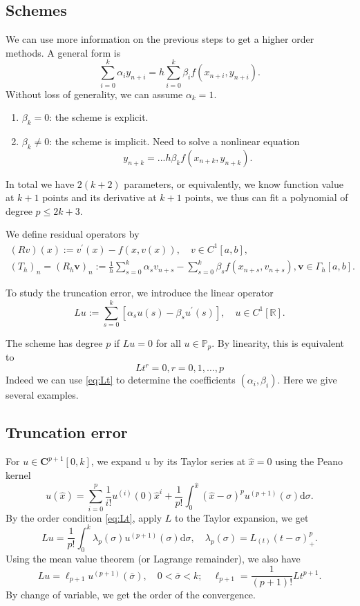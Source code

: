 \documentclass[10pt]{amsart}
\begin{document}
\subsection{Schemes}
We can use more information on the previous steps to get a higher order methods. A general form is
\begin{equation}\label{eq:multistep}
\sum_{i=0}^k \alpha_i y_{n+i} = h\sum_{i=0}^k \beta_i f(x_{n+i}, y_{n+i}).
\end{equation}
Without loss of generality, we can assume $\alpha_k = 1$. 
\begin{enumerate}[1.]
\item $\beta_k = 0$: the scheme is explicit. 
\item $\beta_k \neq 0$: the scheme is implicit. Need to solve a nonlinear equation 
$$
y_{n+k} = ... h\beta_k f(x_{n+k}, y_{n+k}). 
$$
\end{enumerate}
In total we have $2(k+2)$ parameters, or equivalently, we know function value at $k+1$ points and its derivative at $k+1$ points, we thus can fit a polynomial of degree $p \leq 2k+3$. 

We define residual operators by
\begin{equation}
\begin{gathered}
(R {v})(x):={v}^{\prime}(x)-{f}(x, {v}(x)), \quad {v} \in C^1[a, b], \\
(T_h)_n = \left(R_h \boldsymbol{v}\right)_n:=\frac{1}{h} \sum_{s=0}^k \alpha_s {v}_{n+s}-\sum_{s=0}^k \beta_s {f}\left(x_{n+s}, {v}_{n+s}\right), \boldsymbol{v} \in \Gamma_h[a, b].
\end{gathered}
\end{equation}

To study the truncation error, we introduce the linear operator 
$$
L u:=\sum_{s=0}^k\left[\alpha_s u(s)-\beta_s u^{\prime}(s)\right], \quad u \in C^1[\mathbb{R}] .
$$

The scheme has degree $p$ if $L u=0$ for all $u \in \mathbb{P}_p$. By linearity, this is equivalent to
\begin{equation}\label{eq:Lt}
L t^r=0, r=0,1, \ldots, p
\end{equation}
Indeed we can use \eqref{eq:Lt} to determine the coefficients $(\alpha_i, \beta_i)$. Here we give several examples.

\subsection{Truncation error}
For ${u} \in \boldsymbol{C}^{p+1}[0, k]$, we expand $u$ by its Taylor series at $\hat x = 0$ using the Peano kernel
$$
u(\hat x) = \sum_{i=0}^p \frac{1}{i!}u^{(i)}(0) \hat x^i + \frac{1}{p!} \int_0^{\hat x} (\hat x- \sigma)^p {u}^{(p+1)}(\sigma) \mathrm{d} \sigma.
$$
By the order condition \eqref{eq:Lt}, apply $L$ to the Taylor expansion, we get
$$
L {u}=\frac{1}{p!} \int_0^k \lambda_p(\sigma) {u}^{(p+1)}(\sigma) \mathrm{d} \sigma, \quad \lambda_p(\sigma)=L_{(t)}(t-\sigma)_{+}^p.
$$
Using the mean value theorem (or Lagrange remainder), we also have
$$
L {u}=\ell_{p+1} {u}^{(p+1)}(\bar{\sigma}), \quad 0<\bar{\sigma}<k ; \quad \ell_{p+1}= \frac{1}{(p+1)!} L t^{p+1}.
$$
By change of variable, we get the order of the convergence.
\end{document}
